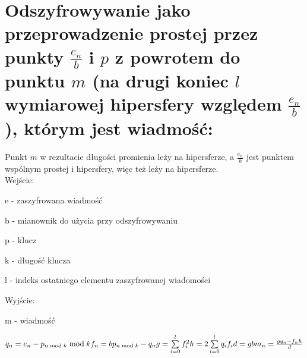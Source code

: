 \documentclass[11pt]{article}
\begin{document}
		\section{
	Odszyfrowywanie jako przeprowadzenie prostej przez punkty \ensuremath{\frac{e_n}{b}} i \ensuremath{p} z powrotem do punktu \ensuremath{m} (na drugi koniec \ensuremath{l} wymiarowej hipersfery względem \ensuremath{\frac{e_n}{b}}), którym jest wiadmość:
	}
	Punkt \ensuremath{m} w rezultacie długości promienia leży na hipersferze, a \ensuremath{\frac{e_n}{b}} jest punktem wspólnym prostej i hipersfery, więc też leży na hipersferze.\\
	Wejście:
	\begin{description}
	\item e - zaszyfrowana wiadmość
	\item b - mianownik do użycia przy odszyfrowywaniu
	\item p - klucz
	\item k - długość klucza
	\item l - indeks ostatniego elementu zaszyfrowanej wiadomości
	\end{description} 
	Wyjście:
	\begin{description}
	\item m - wiadmość
	\end{description}
	\ensuremath {
		q_n = e_n - p_{n\bmod{k}}\bmod{k} \\
		f_n = bp_{n \bmod{k}} - q_n \\
		g = \sum\limits_{i=0}^l f_i^2 \\
		h = 2\sum\limits_{i=0}^l q_if_i \\
		d = gb \\
		m_n = \frac{gq_n - f_nh}{d}
	}
\end{document}
